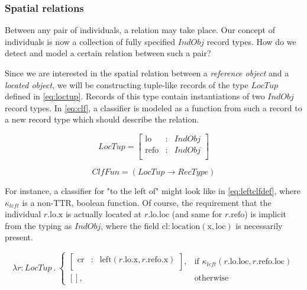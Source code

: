 \documentclass[11pt, a4paper]{article}
\begin{document}
\subsubsection{Spatial relations}

Between any pair of individuals, a relation may take place.
Our concept of individuals is now a collection of fully specified $IndObj$ record types.
How do we detect and model a certain relation between such a pair?

Since we are interested in the spatial relation between a \textit{reference object} and a \textit{located object}, we will be constructing tuple-like records of the type $LocTup$ defined in \autoref{eq:loctup}.
Records of this type contain instantiations of two $IndObj$ record types.
In \autoref{eq:clf}, a classifier is modeled as a function from such a record to a new record type which should describe the relation.

\begin{equation}\label{eq:loctup}
LocTup = \left[\begin{array}{rcl}
    \text{lo} &:& IndObj \\
    \text{refo} &:& IndObj \\
    \end{array}\right]
\end{equation}

\begin{equation}\label{eq:clf}
ClfFun = ( LocTup \rightarrow RecType )
\end{equation}

For instance, a classifier for "to the left of" might look like in \autoref{eq:leftclfdef}, where $\kappa_{left}$ is a non-TTR, boolean function.
Of course, the requirement that the individual $r.\text{lo}.\text{x}$ is actually located at $r.\text{lo}.\text{loc}$ (and same for $r.\text{refo}$) is implicit from the typing as $IndObj$, where the field $\text{cl} : \text{location}(\text{x}, \text{loc})$ is necessarily present.

\begin{equation}\label{eq:leftclfdef}
\lambda r : LocTup \ .\ 
\begin{cases}
\left[\begin{array}{rcl}
    \text{cr} &:& \text{left}(r.\text{lo}.\text{x}, r.\text{refo}.\text{x}) \\
\end{array}\right],
& \text{if } \kappa_{left}(r.\text{lo}.\text{loc}, r.\text{refo}.\text{loc}) \\
[], & \text{otherwise}
\end{cases}
\end{equation}
\end{document}
